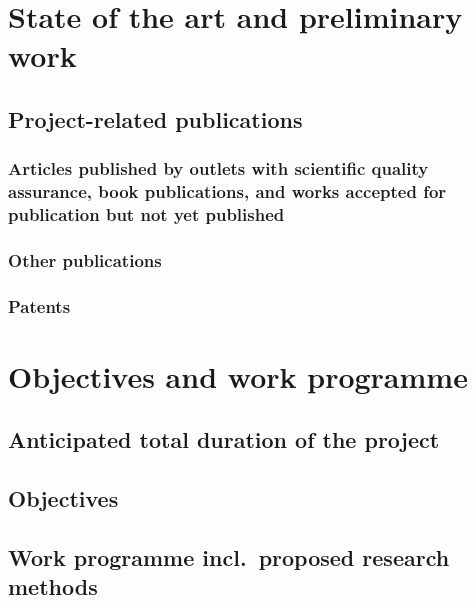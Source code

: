 \documentclass{scrartcl}
\begin{document}
\section{State of the art and preliminary work}

\subsection{Project-related publications}

\subsubsection{Articles published by outlets with scientific quality assurance, book publications, and works accepted for publication but not yet published}
\printbibliography[category=reviewed, heading=none]

\subsubsection{Other publications}
\printbibliography[category=nonreviewed, heading=none]

\subsubsection{Patents}

\printbibliography[category=patents_pending, heading=none]

\printbibliography[category=patents, heading=none]


\section{Objectives and work programme}

\subsection{Anticipated total duration of the project}

\subsection{Objectives}

\subsection{Work programme incl.\ proposed research methods}
\end{document}
